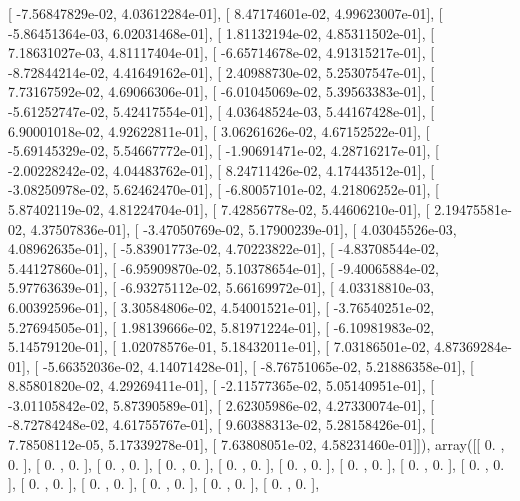 \documentclass{article}
\begin{document}
       [ -7.56847829e-02,   4.03612284e-01],
       [  8.47174601e-02,   4.99623007e-01],
       [ -5.86451364e-03,   6.02031468e-01],
       [  1.81132194e-02,   4.85311502e-01],
       [  7.18631027e-03,   4.81117404e-01],
       [ -6.65714678e-02,   4.91315217e-01],
       [ -8.72844214e-02,   4.41649162e-01],
       [  2.40988730e-02,   5.25307547e-01],
       [  7.73167592e-02,   4.69066306e-01],
       [ -6.01045069e-02,   5.39563383e-01],
       [ -5.61252747e-02,   5.42417554e-01],
       [  4.03648524e-03,   5.44167428e-01],
       [  6.90001018e-02,   4.92622811e-01],
       [  3.06261626e-02,   4.67152522e-01],
       [ -5.69145329e-02,   5.54667772e-01],
       [ -1.90691471e-02,   4.28716217e-01],
       [ -2.00228242e-02,   4.04483762e-01],
       [  8.24711426e-02,   4.17443512e-01],
       [ -3.08250978e-02,   5.62462470e-01],
       [ -6.80057101e-02,   4.21806252e-01],
       [  5.87402119e-02,   4.81224704e-01],
       [  7.42856778e-02,   5.44606210e-01],
       [  2.19475581e-02,   4.37507836e-01],
       [ -3.47050769e-02,   5.17900239e-01],
       [  4.03045526e-03,   4.08962635e-01],
       [ -5.83901773e-02,   4.70223822e-01],
       [ -4.83708544e-02,   5.44127860e-01],
       [ -6.95909870e-02,   5.10378654e-01],
       [ -9.40065884e-02,   5.97763639e-01],
       [ -6.93275112e-02,   5.66169972e-01],
       [  4.03318810e-03,   6.00392596e-01],
       [  3.30584806e-02,   4.54001521e-01],
       [ -3.76540251e-02,   5.27694505e-01],
       [  1.98139666e-02,   5.81971224e-01],
       [ -6.10981983e-02,   5.14579120e-01],
       [  1.02078576e-01,   5.18432011e-01],
       [  7.03186501e-02,   4.87369284e-01],
       [ -5.66352036e-02,   4.14071428e-01],
       [ -8.76751065e-02,   5.21886358e-01],
       [  8.85801820e-02,   4.29269411e-01],
       [ -2.11577365e-02,   5.05140951e-01],
       [ -3.01105842e-02,   5.87390589e-01],
       [  2.62305986e-02,   4.27330074e-01],
       [ -8.72784248e-02,   4.61755767e-01],
       [  9.60388313e-02,   5.28158426e-01],
       [  7.78508112e-05,   5.17339278e-01],
       [  7.63808051e-02,   4.58231460e-01]]), array([[ 0.        ,  0.        ],
       [ 0.        ,  0.        ],
       [ 0.        ,  0.        ],
       [ 0.        ,  0.        ],
       [ 0.        ,  0.        ],
       [ 0.        ,  0.        ],
       [ 0.        ,  0.        ],
       [ 0.        ,  0.        ],
       [ 0.        ,  0.        ],
       [ 0.        ,  0.        ],
       [ 0.        ,  0.        ],
       [ 0.        ,  0.        ],
       [ 0.        ,  0.        ],
       [ 0.        ,  0.        ],
\end{document}
